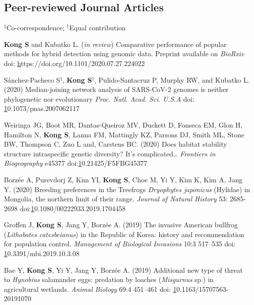 \documentclass[11pt]{article}
\begin{document}
\subsection*{Peer-reviewed Journal Articles}
$^\ddag$Co-correspondence; $^\dag$Equal contribution
\begin{etaremune}

\item \textbf{Kong S} and Kubatko L. (\textit{in review}) Comparative performance of popular methods for hybrid detection using genomic data. Preprint available on \textit {BioRxiv} doi: \href{https://doi.org/10.1101/2020.07.27.224022}https://doi.org/10.1101/2020.07.27.224022

\item  Sánchez-Pacheco S{$^\ddag$}, \textbf{Kong S}{$^\ddag$}, Pulido-Santacruz P, Murphy RW, and Kubatko L. (2020) Median-joining network analysis of SARS-CoV-2 genomes is neither phylogenetic nor evolutionary \textit{Proc. Natl. Acad. Sci. U.S.A} doi: \href{https://doi.org/10.1073/pnas.2007062117}10.1073/pnas.2007062117
\item Weiringa JG, Boot MR,  Dantas-Queiroz MV, Duckett D, Fonseca EM, Glon H, Hamilton N, \textbf{Kong S}, Lanna FM, Mattingly KZ, Parsons DJ, Smith ML, Stone BW, Thompson C, Zuo L and, Carstens BC. (2020) Does habitat stability structure intraspecific genetic diversity? It’s complicated… \textit{Frontiers in Biogeography} e45377 doi:\href{https://doi.org/10.21425/F5FBG45377}10.21425/F5FBG45377
\item Borzée A, Purevdorj Z, Kim YI, \textbf{Kong S}, Choe M, Yi Y, Kim K, Kim A, Jang Y. (2020) Breeding preferences in the Treefrogs \textit{Dryophytes japonicus} (Hylidae) in Mongolia, the northern limit of their range. \textit{Journal of Natural History} 53: 2685-2698 doi:\href{10.1080/00222933.2019.1704458}10.1080/00222933.2019.1704458
\item Groffen J, \textbf{Kong S}, Jang Y, Borzée A. (2019) The invasive American bullfrog (\textit{Lithobates catesbeianus}) in the Republic of Korea: history and recommendation for population control. \textit{Management of Biological Invasions} 10:3 517–535 doi: \href{10.3391/mbi.2019.10.3.08}10.3391/mbi.2019.10.3.08
\item Bae Y, \textbf{Kong S}, Yi Y, Jang Y, Borzée A. (2019) Additional new type of threat to \textit{Hynobius} salamander eggs: predation by loaches (\textit{Misgurnus} sp.) in agricultural wetlands. \textit{Animal Biology} 69:4 451–461 doi: \href{https://doi.org/10.1163/15707563-20191070}10.1163/15707563-20191070

\end{etaremune}
\end{document}
